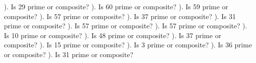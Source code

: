 \documentclass{article}%
\begin{document}
). Is 29 prime or composite?%
\newline%
\newline%
). Is 60 prime or composite?%
\newline%
\newline%
). Is 59 prime or composite?%
\newline%
\newline%
). Is 57 prime or composite?%
\newline%
\newline%
). Is 37 prime or composite?%
\newline%
\newline%
). Is 31 prime or composite?%
\newline%
\newline%
). Is 57 prime or composite?%
\newline%
\newline%
). Is 57 prime or composite?%
\newline%
\newline%
). Is 10 prime or composite?%
\newline%
\newline%
). Is 48 prime or composite?%
\newline%
\newline%
). Is 37 prime or composite?%
\newline%
\newline%
). Is 15 prime or composite?%
\newline%
\newline%
). Is 3 prime or composite?%
\newline%
\newline%
). Is 36 prime or composite?%
\newline%
\newline%
). Is 31 prime or composite?%
\end{document}
